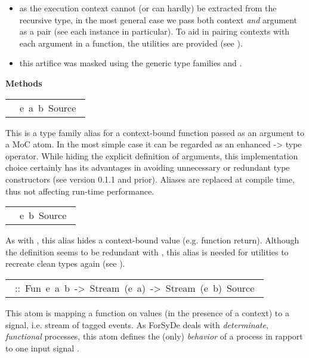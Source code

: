 \begin{haddockdesc}
\begin{itemize}
\item
as the execution context cannot (or can hardly) be extracted from
 the recursive type, in the most general case we pass both context
 \emph{and} argument as a pair (see each instance in particular). To aid
 in pairing contexts with each argument in a function, the 
 utilities are provided (see ).\par

\item
this artifice was masked using the generic type families 
 and . \par

\end{itemize}

\haddockpremethods{}\textbf{Methods}
\begin{haddockdesc}
\item[\begin{tabular}{@{}l}\ \haddockid{Fun}\ e\ a\ b\ Source\ \end{tabular}]
\haddockbegindoc
This is a type family alias for a context-bound function passed as an argument to a MoC atom. In the most simple case it can be regarded as an enhanced -> type operator. While hiding the explicit definition of arguments, this implementation choice certainly has its advantages in avoiding unnecessary or redundant type constructors (see version 0.1.1 and prior). Aliases are replaced at compile time, thus not affecting run-time performance.\par

\item[\begin{tabular}{@{}l}\ \haddockid{Ret}\ e\ b\ Source\ \end{tabular}]
\haddockbegindoc
As with , this alias hides a context-bound value (e.g. function return). Although the definition seems to be redundant with , this alias is needed for utilities to recreate clean types again (see \haddockid{-*}).\par

\item[\begin{tabular}{@{}l}\haddockid{(-.-)}\ ::\ Fun\ e\ a\ b\ ->\ Stream\ (e\ a)\ ->\ Stream\ (e\ b)\ Source\ \end{tabular}]
\haddockbegindoc
This atom is mapping a function on values (in the presence of a context) to a signal, i.e. stream of tagged events. As ForSyDe deals with \emph{determinate}, \emph{functional} processes, this atom defines the (only) \emph{behavior} of a process in rapport to one input signal  \cite{Lee98}.\par


\end{haddockdesc}
\end{haddockdesc}
